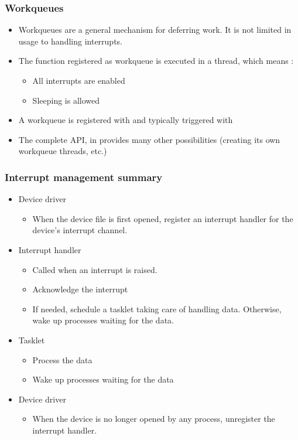 \begin{frame}
  \frametitle{Workqueues}
  \begin{itemize}
  \item Workqueues are a general mechanism for deferring work. It is
    not limited in usage to handling interrupts.
  \item The function registered as workqueue is executed in a thread,
    which means :
    \begin{itemize}
    \item All interrupts are enabled
    \item Sleeping is allowed
    \end{itemize}
  \item A workqueue is registered with  and typically
    triggered with 
  \item The complete API, in  provides
    many other possibilities (creating its own workqueue threads,
    etc.)
  \end{itemize}
\end{frame}

\begin{frame}
  \frametitle{Interrupt management summary}
  \begin{itemize}
  \item Device driver
    \begin{itemize}
    \item When the device file is first opened, register an interrupt
      handler for the device's interrupt channel.
    \end{itemize}
  \item Interrupt handler
    \begin{itemize}
    \item Called when an interrupt is raised.
    \item Acknowledge the interrupt
    \item If needed, schedule a tasklet taking care of handling
      data. Otherwise, wake up processes waiting for the data.
    \end{itemize}
  \item Tasklet
    \begin{itemize}
    \item Process the data
    \item Wake up processes waiting for the data
    \end{itemize}
  \item Device driver
    \begin{itemize}
    \item When the device is no longer opened by any process,
      unregister the interrupt handler.
    \end{itemize}
  \end{itemize}
\end{frame}

